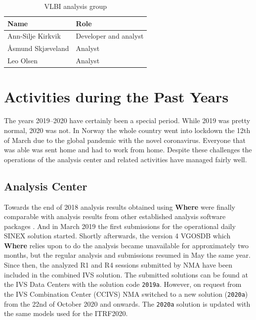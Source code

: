 \documentclass[twocolumn,twoside]{svmultivs_br} %
\begin{document}
\begin{table}[htb!]
\caption{VLBI analysis group}
\begin{center}
\begin{tabularx}{\linewidth}{X|X}
\hline
Name  & Role \\
\hline
Ann-Silje Kirkvik & Developer and analyst \\
\AA smund Skj\ae veland & Analyst \\
Leo Olsen & Analyst \\
\hline
\end{tabularx}
\end{center}
\label{tab:staff}
\end{table}

%
\section{Activities during the Past Years}

The years 2019--2020 have certainly been a special period. While 2019 was pretty normal, 2020 was not. In Norway the
whole country went into lockdown the 12th of March due to the global pandemic with the novel coronavirus. Everyone
that was able was sent home and had to work from home. Despite these challenges the operations of the analysis center
and related activities have managed fairly well. 

\subsection{Analysis Center}
%
Towards the end of 2018 analysis results obtained using \textbf{Where} were finally comparable with analysis results
from other established analysis software packages \cite{kirkvik2019}. And in March 2019 the first submissions for
the operational daily SINEX solution started. Shortly afterwards, the version 4 VGOSDB which \textbf{Where} relies upon
to do the analysis became unavailable for approximately two months, but the regular analysis and submissions resumed
in May the same year. Since then, the analyzed R1 and R4 sessions submitted by NMA have been included in the combined
IVS solution. The submitted solutions can be found at the IVS Data Centers with the solution code \texttt{2019a}.
However, on request from the IVS Combination Center (CCIVS) NMA switched to a new solution (\texttt{2020a}) from the
22nd of October 2020 and onwards. The \texttt{2020a} solution is updated with the same models used for the ITRF2020.
\end{document}
